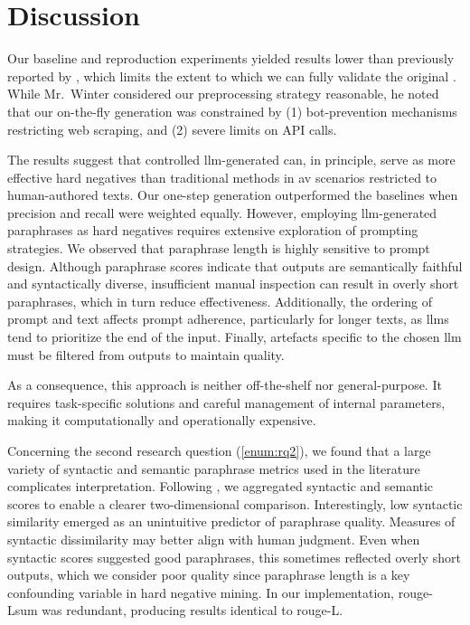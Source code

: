 \chapter{Discussion}
\label{chap:discussion}

Our baseline and reproduction experiments yielded results lower than previously reported by \citet{koppel_determining_2014}, which limits the extent to which we can fully validate the original \impAppr{}. 
While Mr.~Winter considered our preprocessing strategy reasonable, he noted that our on-the-fly \imp{} generation was constrained by (1) bot-prevention mechanisms restricting web scraping, and (2) severe limits on API calls.  

The results suggest that controlled \ac{llm}-generated \imps{} can, in principle, serve as more effective hard negatives than traditional methods in \ac{av} scenarios restricted to human-authored texts. 
Our one-step \imp{} generation outperformed the baselines when precision and recall were weighted equally.  
However, employing \ac{llm}-generated paraphrases as hard negatives requires extensive exploration of prompting strategies.  
We observed that paraphrase length is highly sensitive to prompt design. 
Although paraphrase scores indicate that outputs are semantically faithful and syntactically diverse, insufficient manual inspection can result in overly short paraphrases, which in turn reduce \impAppr{} effectiveness.  
Additionally, the ordering of prompt and text affects prompt adherence, particularly for longer texts, as \acp{llm} tend to prioritize the end of the input.  
Finally, artefacts specific to the chosen \ac{llm} must be filtered from outputs to maintain quality. 

As a consequence, this approach is neither off-the-shelf nor general-purpose. 
It requires task-specific solutions and careful management of internal parameters, making it computationally and operationally expensive.


Concerning the second research question (\autoref{enum:rq2}), we found that a large variety of syntactic and semantic paraphrase metrics used in the literature complicates interpretation. 
Following \citet{gohsen_captions_2023}, we aggregated syntactic and semantic scores to enable a clearer two-dimensional comparison.  
Interestingly, low syntactic similarity emerged as an unintuitive predictor of paraphrase quality. 
Measures of syntactic dissimilarity may better align with human judgment.  
Even when syntactic scores suggested good paraphrases, this sometimes reflected overly short outputs, which we consider poor quality since paraphrase length is a key confounding variable in hard negative mining.  
In our implementation, \ac{rouge}-Lsum was redundant, producing results identical to \ac{rouge}-L.  

